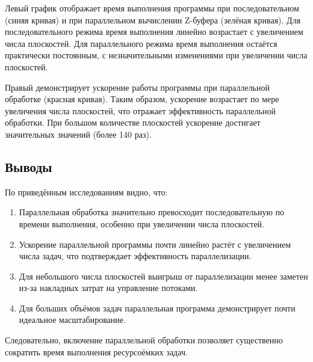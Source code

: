 Левый график отображает время выполнения программы при последовательном (синяя кривая) и при параллельном вычислении Z-буфера (зелёная кривая). Для последовательного режима время выполнения линейно возрастает с увеличением числа плоскостей. Для параллельного режима время выполнения остаётся практически постоянным, с незначительными изменениями при увеличении числа плоскостей.

Правый демонстрирует ускорение работы программы при параллельной обработке (красная кривая). Таким образом, ускорение возрастает по мере увеличения числа плоскостей, что отражает эффективность параллельной обработки. При большом количестве плоскостей ускорение достигает значительных значений (более 140 раз).


\subsection{Выводы}

\hspace{1.25cm}
По приведённым исследованиям видно, что:

\begin{enumerate}
\item Параллельная обработка значительно превосходит последовательную по времени выполнения, особенно при увеличении числа плоскостей.

\item Ускорение параллельной программы почти линейно растёт с увеличением числа задач, что подтверждает эффективность параллелизации.

\item Для небольшого числа плоскостей выигрыш от параллелизации менее заметен из-за накладных затрат на управление потоками.

\item Для больших объёмов задач параллельная программа демонстрирует почти идеальное масштабирование.
\end{enumerate}

Следовательно, включение параллельной обработки позволяет существенно сократить время выполнения ресурсоёмких задач.

\newpage